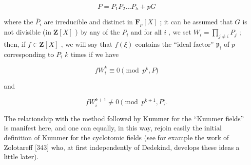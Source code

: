 \[
P = P _ {1} P _ {2} \dots P _ {h} + p G
\]

where the \(\overline{P}_i\) are irreducible and distinct in \(\mathbf{F}_p[X]\) ; it can be assumed that \(G\) is not divisible (in \(\mathbf{Z}[X]\) ) by any of the \(P_i\) and for all \(i\) , we set \(W_i = \prod_{j \neq i} P_j\) ; then, if \(f \in \mathbf{Z}[X]\) , we will say that \(f(\xi)\) contains the ``ideal factor'' \(\mathfrak{p}_i\) of \(p\) corresponding to \(P_i\) \(k\) times if we have

\[
f W _ {i} ^ {k} \equiv 0 \pmod {p ^ {k}, P}
\]

and

\[
f W _ {i} ^ {k + 1} \not \equiv 0 \pmod {p ^ {k + 1}, P}.
\]

The relationship with the method followed by Kummer for the ``Kummer fields'' is manifest here, and one can equally, in this way, rejoin easily the initial definition of Kummer for the cyclotomic fields (see for example the work of Zolotareff {[}343{]} who, at first independently of Dedekind, develops these ideas a little later).

